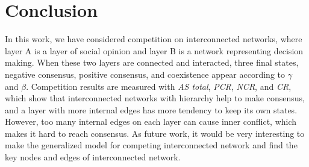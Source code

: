 \documentclass[english]{cccconf}
\begin{document}
\section{Conclusion}
In this work, we have considered competition on interconnected networks, where layer A is a layer of social opinion and layer B is a network representing decision making. When these two layers are connected and interacted, three final states, negative consensus, positive consensus, and coexistence appear according to $\gamma$ and $\beta$. Competition results are measured with \textit{AS total}, \textit{PCR}, \textit{NCR}, and \textit{CR}, which show that interconnected networks with hierarchy help to make consensus, and a layer with more internal edges has more tendency to keep its own states. However, too many internal edges on each layer can cause inner conflict, which makes it hard to reach consensus. As future work, it would be very interesting to make the generalized model for competing interconnected network and find the key nodes and edges of interconnected network.
\end{document}
